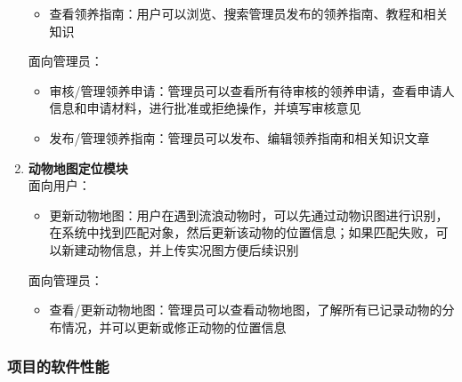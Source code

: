 \documentclass[12pt,a4paper,UTF8]{article}
\begin{document}
\begin{enumerate}
\begin{itemize}
    \item 查看领养指南：用户可以浏览、搜索管理员发布的领养指南、教程和相关知识
  \end{itemize}
  面向管理员：
  \begin{itemize}
    \item 审核/管理领养申请：管理员可以查看所有待审核的领养申请，查看申请人信息和申请材料，进行批准或拒绝操作，并填写审核意见
    \item 发布/管理领养指南：管理员可以发布、编辑领养指南和相关知识文章
  \end{itemize}
  \item \textbf{动物地图定位模块} \\
  面向用户：
  \begin{itemize}
    \item 更新动物地图：用户在遇到流浪动物时，可以先通过动物识图进行识别，在系统中找到匹配对象，然后更新该动物的位置信息；如果匹配失败，可以新建动物信息，并上传实况图方便后续识别
  \end{itemize}
  面向管理员：
  \begin{itemize}
    \item 查看/更新动物地图：管理员可以查看动物地图，了解所有已记录动物的分布情况，并可以更新或修正动物的位置信息
  \end{itemize}
\end{enumerate}

\subsubsection{项目的软件性能}
\end{document}
